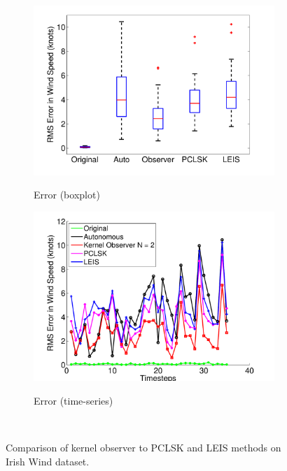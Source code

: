 \documentclass[letterpaper,12pt,peerreviewca,draftcls]{IEEEtran}
\begin{document}
\begin{figure}
\begin{minipage}{0.8\textwidth}
	
	\begin{subfigure}[t]{0.48\textwidth}
		\includegraphics[width=\linewidth]{"Figure 11a"} \label{fig:irish_boxplots}
		\caption{Error (boxplot)}
	\end{subfigure}
	\begin{subfigure}[t]{0.48\textwidth}
		\includegraphics[width=\linewidth]{Figure 11b} \label{fig:irish_comp}
		\caption{Error (time-series)}
	\end{subfigure}
	\caption{Comparison of kernel observer to PCLSK and LEIS methods on Irish Wind dataset.}\label{irish}
\end{minipage}\\


\end{figure}
\end{document}
